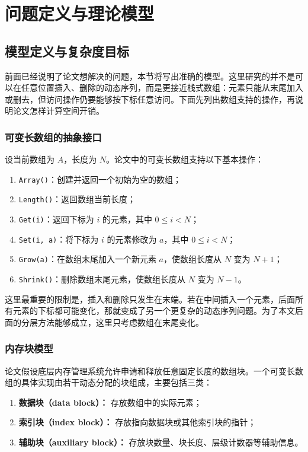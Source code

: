 \documentclass[12pt,a4paper]{article}
\begin{document}
\section{问题定义与理论模型}

\subsection{模型定义与复杂度目标}

前面已经说明了论文想解决的问题，本节将写出准确的模型。这里研究的并不是可以在任意位置插入、删除的动态序列，而是更接近栈式数组：元素只能从末尾加入或删去，但访问操作仍要能够按下标任意访问。下面先列出数组支持的操作，再说明论文怎样计算空间开销\cite{tarjan2023optimalresizablearrays}。

\subsubsection{可变长数组的抽象接口}

设当前数组为 $A$，长度为 $N$。论文中的可变长数组支持以下基本操作：

\begin{enumerate}
    \item \texttt{Array()}：创建并返回一个初始为空的数组；
    \item \texttt{Length()}：返回数组当前长度；
    \item \texttt{Get(i)}：返回下标为 $i$ 的元素，其中 $0 \leq i < N$；
    \item \texttt{Set(i, a)}：将下标为 $i$ 的元素修改为 $a$，其中 $0 \leq i < N$；
    \item \texttt{Grow(a)}：在数组末尾加入一个新元素 $a$，使数组长度从 $N$ 变为 $N+1$；
    \item \texttt{Shrink()}：删除数组末尾元素，使数组长度从 $N$ 变为 $N-1$。
\end{enumerate}

这里最重要的限制是，插入和删除只发生在末端。若在中间插入一个元素，后面所有元素的下标都可能变化，那就变成了另一个更复杂的动态序列问题。为了本文后面的分层方法能够成立，这里只考虑数组在末尾变化。

\subsubsection{内存块模型}

论文假设底层内存管理系统允许申请和释放任意固定长度的数组块。一个可变长数组的具体实现由若干动态分配的块组成，主要包括三类：

\begin{enumerate}
    \item \textbf{数据块（data block）：} 存放数组中的实际元素；
    \item \textbf{索引块（index block）：} 存放指向数据块或其他索引块的指针；
    \item \textbf{辅助块（auxiliary block）：} 存放块数量、块长度、层级计数器等辅助信息。
\end{enumerate}
\end{document}
